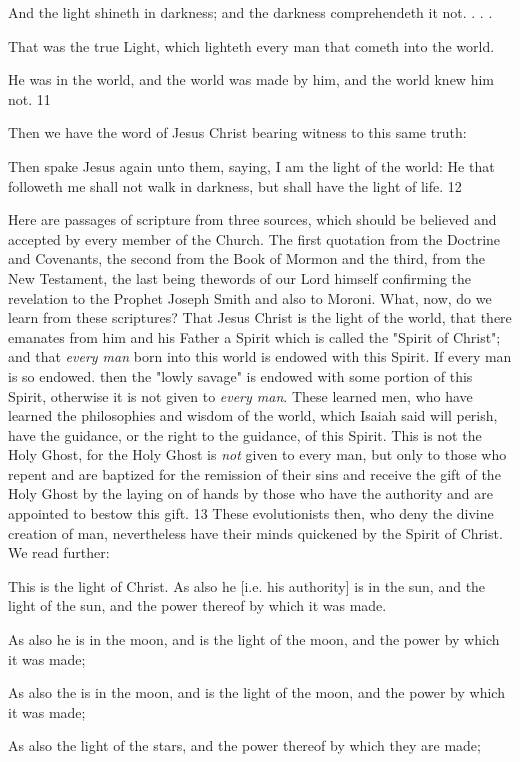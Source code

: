 And the light shineth in darkness; and the darkness comprehendeth it not. . . .

That was the true Light, which lighteth every man that cometh into the world.

He was in the world, and the world was made by him, and the world knew him not. 11

Then we have the word of Jesus Christ bearing witness to this same truth:

Then spake Jesus again unto them, saying, I am the light of the world: He that followeth me
shall not walk in darkness, but shall have the light of life. 12

Here are passages of scripture from three sources, which should be believed and accepted by
every member of the Church. The first quotation from the Doctrine and Covenants, the
second from the Book of Mormon and the third, from the New Testament, the last being thewords of our Lord himself confirming the revelation to the Prophet Joseph Smith and also to
Moroni. What, now, do we learn from these scriptures? That Jesus Christ is the light of the
world, that there emanates from him and his Father a Spirit which is called the "Spirit of
Christ"; and that \textit{every man} born into this world is endowed with this Spirit. If every man is
so endowed. then the "lowly savage" is endowed with some portion of this Spirit, otherwise
it is not given to \textit{every man}. These learned men, who have learned the philosophies and
wisdom of the world, which Isaiah said will perish, have the guidance, or the right to the
guidance, of this Spirit. This is not the Holy Ghost, for the Holy Ghost is \textit{not} given to every
man, but only to those who repent and are baptized for the remission of their sins and receive
the gift of the Holy Ghost by the laying on of hands by those who have the authority and are
appointed to bestow this gift. 13 These evolutionists then, who deny the divine creation of
man, nevertheless have their minds quickened by the Spirit of Christ. We read further:

This is the light of Christ. As also he [i.e. his authority] is in the sun, and the light of the sun,
and the power thereof by which it was made.

As also he is in the moon, and is the light of the moon, and the power by which it was made;

As also the is in the moon, and is the light of the moon, and the power by which it was made;

As also the light of the stars, and the power thereof by which they are made;

